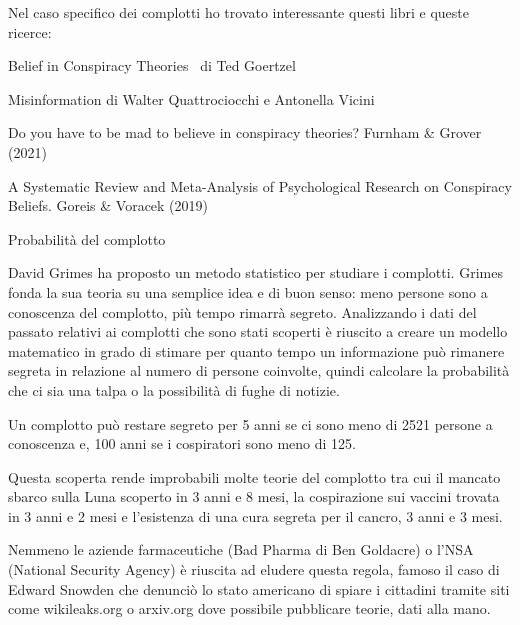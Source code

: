 \documentclass[12pt]{book} %
\begin{document}
\begin{mdframed}[linewidth=1pt]
\bigskip

Nel caso specifico dei complotti ho trovato interessante questi libri e queste ricerce:

Belief in Conspiracy Theories \ di Ted Goertzel

Misinformation di Walter Quattrociocchi e Antonella Vicini

Do you have to be mad to believe in conspiracy theories? Furnham \& Grover
(2021)

A Systematic Review and Meta-Analysis of Psychological Research on Conspiracy Beliefs. Goreis \& Voracek
(2019) 


\bigskip

Probabilità del complotto

David Grimes ha proposto un metodo statistico per studiare i
complotti. Grimes fonda la sua
teoria su una semplice idea e di buon senso: meno persone sono a conoscenza del complotto, più tempo rimarrà segreto.
Analizzando i dati del passato relativi ai complotti che sono stati scoperti è riuscito a creare un modello matematico
in grado di stimare per quanto tempo un informazione può rimanere segreta in relazione al numero di persone coinvolte,
quindi calcolare la probabilità che ci sia una talpa o la possibilità di fughe di notizie.

Un complotto può restare segreto per 5 anni se ci sono meno di 2521 persone a conoscenza e, 100 anni se i cospiratori
sono meno di 125.

Questa scoperta rende improbabili molte teorie del complotto tra cui il mancato sbarco sulla Luna scoperto in 3 anni e 8
mesi, la cospirazione sui vaccini trovata in 3 anni e 2 mesi e l'esistenza di una cura segreta per
il cancro, 3 anni e 3 mesi.

Nemmeno le aziende farmaceutiche (Bad Pharma di Ben
Goldacre) o
l'NSA (National Security Agency) è riuscita ad eludere questa regola, famoso il caso di Edward
Snowden che denunciò lo stato americano di spiare i cittadini tramite siti come wikileaks.org o arxiv.org dove
possibile pubblicare teorie, dati alla mano.



\end{mdframed}
\end{document}
